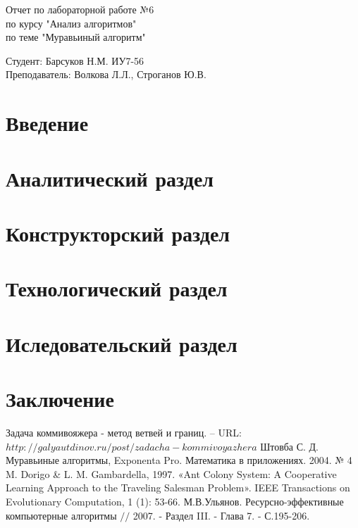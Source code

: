 \documentclass[a4paper, 14pt]{article}
\begin{document}
	\begin{titlepage}
		\begin{center}
			\begin{LARGE}
				Отчет по лабораторной работе №6\\
				по курсу "Анализ алгоритмов"\\
				по теме "Муравьиный алгоритм"
			\end{LARGE}
			
			\begin{Large}
				\vspace{10cm}
				Студент: Барсуков Н.М. ИУ7-56\\
				Преподаватель: Волкова Л.Л.,
				Строганов Ю.В.
			\end{Large}
		\end{center}
	\end{titlepage}
	
	\newpage
	\tableofcontents
	
	\newpage
	\section*{Введение}
	
	
	\newpage
	\section{Аналитический раздел}
	
	
	\newpage
	\section{Конструкторский раздел}
	
	
	\newpage
	\section{Технологический раздел}
	
	
	\newpage
	\section{Иследовательский раздел}
	
	
	\newpage
	\section{Заключение}
	
	
	\newpage
	\begin{thebibliography}{00} %
		Задача коммивояжера - метод ветвей и границ. -- URL: $http://galyautdinov.ru/post/zadacha-kommivoyazhera$
		Штовба С. Д. Муравьиные алгоритмы, Exponenta Pro. Математика в приложениях. 2004. № 4
		M. Dorigo \& L. M. Gambardella, 1997. «Ant Colony System: A Cooperative Learning Approach to the Traveling Salesman Problem». IEEE Transactions on Evolutionary Computation, 1 (1): 53-66.
		М.В.Ульянов. Ресурсно-эффективные компьютерные алгоритмы $//$ 2007. - Раздел III. - Глава 7. - С.195-206.
	\end{thebibliography}
\end{document}
